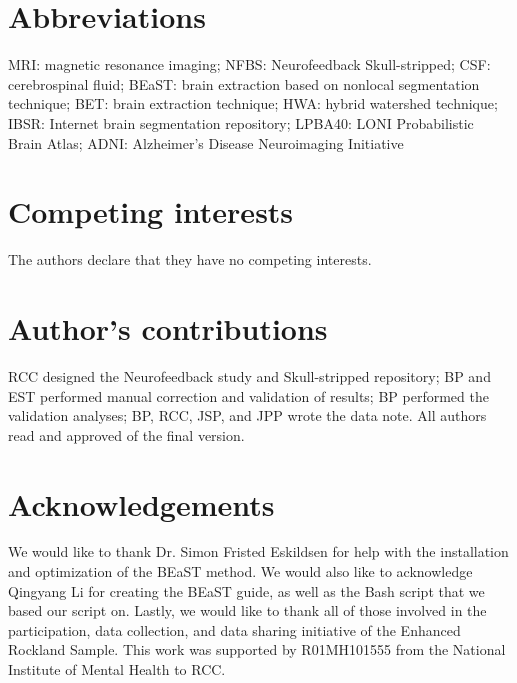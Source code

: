 
\section*{Abbreviations}
  MRI: magnetic resonance imaging; NFBS: Neurofeedback Skull-stripped; CSF: cerebrospinal fluid; BEaST: brain extraction based on nonlocal segmentation technique; BET: brain extraction technique; HWA: hybrid watershed technique; IBSR: Internet brain segmentation repository; LPBA40: LONI Probabilistic Brain Atlas; ADNI: Alzheimer's Disease Neuroimaging Initiative

\section*{Competing interests}
  The authors declare that they have no competing interests.

\section*{Author's contributions}
    RCC designed the Neurofeedback study and Skull-stripped repository;  BP and EST performed manual correction and validation of results; BP performed the validation analyses; BP, RCC, JSP, and JPP wrote the data note. All authors read and approved of the final version.

\section*{Acknowledgements}
  We would like to thank Dr. Simon Fristed Eskildsen for help with the installation and optimization of the BEaST method. We would also like to acknowledge Qingyang Li for creating the BEaST guide, as well as the Bash script that we based our script on. Lastly, we would like to thank all of those involved in the participation, data collection, and data sharing initiative of the Enhanced Rockland Sample. This work was supported by R01MH101555 from the National Institute of Mental Health to RCC.
